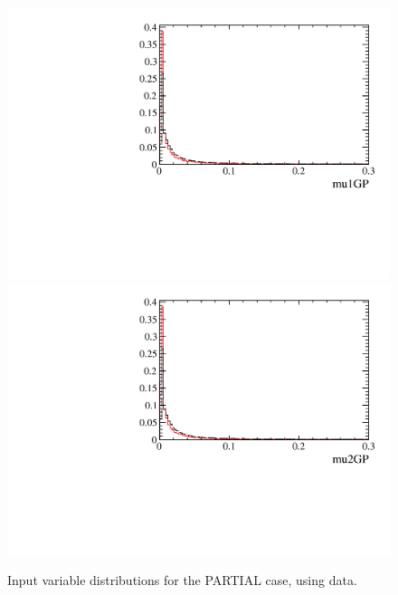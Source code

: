 \begin{figure} [htb!]
\begin{center}
\includegraphics[scale=0.20]{figs/mu1GPPARTIAL2pipi.pdf}
\includegraphics[scale=0.20]{figs/mu2GPPARTIAL2pipi.pdf}
\caption{Input variable distributions for the PARTIAL case, using \Kspipi data.
\label{fig:MVAhistos_PARTIAL2pipi}}
\end{center}
\end{figure}


